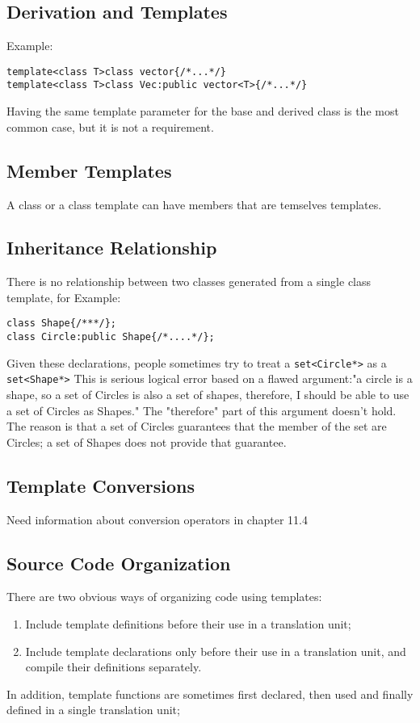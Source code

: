 \documentclass[11pt, a4paper]{book}
\begin{document}
\begin{itemize}
\subsection{Derivation and Templates}
Example:
\begin{verbatim}
template<class T>class vector{/*...*/}
template<class T>class Vec:public vector<T>{/*...*/}
\end{verbatim}
Having the same template parameter for the base and derived class is the most common case, but it is not a requirement. 
\subsection{Member Templates}
A class or a class template can have members that are temselves templates.
\subsection{Inheritance Relationship}
There is no relationship between two classes generated from a single class template, for Example:
\begin{verbatim}
class Shape{/***/};
class Circle:public Shape{/*....*/};
\end{verbatim}
Given these declarations, people sometimes try to treat a \verb|set<Circle*>| as a \verb|set<Shape*>|
This is serious logical error based on a flawed argument:"a circle is a shape, so a set of Circles is also a set of shapes, therefore, I should be able to use a set of Circles as Shapes." The "therefore" part of this argument doesn't hold. The reason is that a set of Circles guarantees that the member of the set are Circles; a set of Shapes does not provide that guarantee.
\subsection{Template Conversions}
Need information about conversion operators in chapter 11.4
\subsection {Source Code Organization}
There are two obvious ways of organizing code using templates:
\begin{enumerate}
\item Include template definitions before their use in a translation unit;
\item Include template declarations only before their use in a translation unit, and compile their definitions separately.
\end{enumerate} In addition, template functions are sometimes first declared, then used and finally defined in a single translation unit;


\end{itemize}
\end{document}

